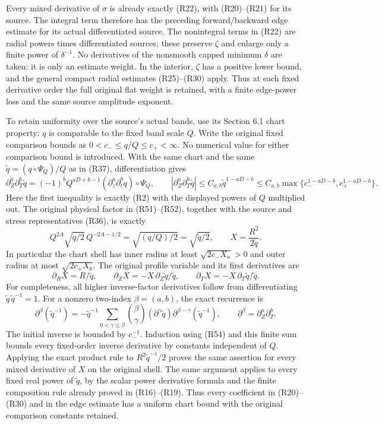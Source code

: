 \documentclass[10pt,a4paper]{article}
\begin{document}
Every mixed derivative of \(\sigma\) is already exactly (R22), with (R20)--(R21) for its source. The integral term therefore has the preceding forward/backward edge estimate for its actual differentiated source. The nonintegral terms in (R22) are radial powers times differentiated sources; these preserve \(\zeta\) and enlarge only a finite power of \(\delta^{-1}\). No derivatives of the nonsmooth capped minimum \(\delta\) are taken: it is only an estimate weight. In the interior, \(\zeta\) has a positive lower bound, and the general compact radial estimates (R25)--(R30) apply. Thus at each fixed derivative order the full original flat weight is retained, with a finite edge-power loss and the same source amplitude exponent.

To retain uniformity over the source's actual bands, use its Section 6.1 chart property: \(q\) is comparable to the fixed band scale \(Q\). Write the original fixed comparison bounds as \(0<c_-\le q/Q\le c_+<\infty\). No numerical value for either comparison bound is introduced. With the same chart and the same \(\widetilde q=(q\circ\Psi_Q)/Q\) as in (R37), differentiation gives \[
\partial_Z^a\partial_T^b\widetilde q
=(-1)^bQ^{aD+b-1}(\partial_z^a\partial_t^bq)\circ\Psi_Q,
\qquad
|\partial_Z^a\partial_T^b\widetilde q|
\le C_{a,b}\widetilde q^{1-aD-b}
\le C_{a,b}\max\{c_-^{1-aD-b},c_+^{1-aD-b}\}.
\tag{R54}
\] Here the first inequality is exactly (R2) with the displayed powers of \(Q\) multiplied out. The original physical factor in (R51)--(R52), together with the source and stress representatives (R36), is exactly \[
Q^{2A}\sqrt{q/2}\,Q^{-2A-1/2}
=\sqrt{(q/Q)/2}=\sqrt{\widetilde q/2},
\qquad
X=\frac{R^2}{2\widetilde q}.
\tag{R55}
\] In particular the chart shell has inner radius at least \(\sqrt{2c_-X_a}>0\) and outer radius at most \(\sqrt{2c_+X_b}\). The original profile variable and its first derivatives are \[
\partial_RX=R/\widetilde q,\qquad
\partial_ZX=-X\,\partial_Z\widetilde q/\widetilde q,\qquad
\partial_TX=-X\,\partial_T\widetilde q/\widetilde q.
\tag{R56}
\] For completeness, all higher inverse-factor derivatives follow from differentiating \(\widetilde q\,\widetilde q^{-1}=1\). For a nonzero two-index \(\beta=(a,b)\), the exact recurrence is \[
\partial^\beta(\widetilde q^{-1})
=-\widetilde q^{-1}
\sum_{0<\gamma\le\beta}\binom{\beta}{\gamma}
(\partial^\gamma\widetilde q)
\partial^{\beta-\gamma}(\widetilde q^{-1}),
\qquad \partial^\beta=\partial_Z^a\partial_T^b.
\tag{R57}
\] The initial inverse is bounded by \(c_-^{-1}\). Induction using (R54) and this finite sum bounds every fixed-order inverse derivative by constants independent of \(Q\). Applying the exact product rule to \(R^2\widetilde q^{-1}/2\) proves the same assertion for every mixed derivative of \(X\) on the original shell. The same argument applies to every fixed real power of \(\widetilde q\), by the scalar power derivative formula and the finite composition rule already proved in (R16)--(R19). Thus every coefficient in (R20)--(R30) and in the edge estimate has a uniform chart bound with the original comparison constants retained.
\end{document}
